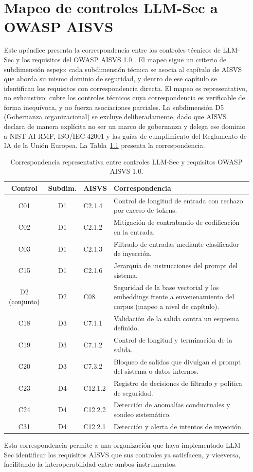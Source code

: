\chapter{Mapeo de controles LLM-Sec a OWASP AISVS}
\label{ap:mapeo-aisvs}

Este apéndice presenta la correspondencia entre los controles técnicos de LLM-Sec y los requisitos del OWASP AISVS 1.0 \cite{aisvs}. El mapeo sigue un criterio de subdimensión espejo: cada subdimensión técnica se asocia al capítulo de AISVS que aborda su mismo dominio de seguridad, y dentro de ese capítulo se identifican los requisitos con correspondencia directa. El mapeo es representativo, no exhaustivo: cubre los controles técnicos cuya correspondencia es verificable de forma inequívoca, y no fuerza asociaciones parciales. La subdimensión D5 (Gobernanza organizacional) se excluye deliberadamente, dado que AISVS declara de manera explícita no ser un marco de gobernanza y delega ese dominio a NIST AI RMF, ISO/IEC 42001 y las guías de cumplimiento del Reglamento de IA de la Unión Europea. La Tabla~\ref{tab:mapeo-aisvs} presenta la correspondencia.

\begin{table}[H]
  \centering
  \caption{Correspondencia representativa entre controles LLM-Sec y requisitos OWASP AISVS 1.0.}
  \label{tab:mapeo-aisvs}
  \begin{tabularx}{\textwidth}{@{} c c l X @{}}
    \toprule
    \textbf{Control} & \textbf{Subdim.} & \textbf{AISVS} & \textbf{Correspondencia} \\
    \midrule
    C01 & D1 & C2.1.4 & Control de longitud de entrada con rechazo por exceso de tokens. \\
    C02 & D1 & C2.1.2 & Mitigación de contrabando de codificación en la entrada. \\
    C03 & D1 & C2.1.3 & Filtrado de entradas mediante clasificador de inyección. \\
    C15 & D1 & C2.1.6 & Jerarquía de instrucciones del prompt del sistema. \\
    D2 (conjunto) & D2 & C08 & Seguridad de la base vectorial y los embeddings frente a envenenamiento del corpus (mapeo a nivel de capítulo). \\
    C18 & D3 & C7.1.1 & Validación de la salida contra un esquema definido. \\
    C19 & D3 & C7.1.2 & Control de longitud y terminación de la salida. \\
    C20 & D3 & C7.3.2 & Bloqueo de salidas que divulgan el prompt del sistema o datos internos. \\
    C23 & D4 & C12.1.2 & Registro de decisiones de filtrado y política de seguridad. \\
    C24 & D4 & C12.2.2 & Detección de anomalías conductuales y sondeo sistemático. \\
    C31 & D4 & C12.2.1 & Detección y alerta de intentos de inyección. \\
    \bottomrule
  \end{tabularx}
\end{table}

Esta correspondencia permite a una organización que haya implementado LLM-Sec identificar los requisitos AISVS que sus controles ya satisfacen, y viceversa, facilitando la interoperabilidad entre ambos instrumentos.